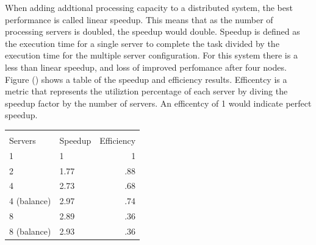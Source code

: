 \documentclass{article}
\begin{document}
\begin{multicols}{2}
\noindent{}

When adding addtional processing capacity to a distributed system, the best performance is called linear speedup.  This means that as the number of processing servers is doubled, the speedup would double. Speedup is defined as the execution time for a single server to complete the task divided by the execution time for the multiple server configuration.  For this system there is a less than linear speedup, and loss of improved perfomance after four nodes.  Figure () shows a table of the speedup and efficiency results.  Efficentcy is a metric that represents the utiliztion percentage of each server by diving the speedup factor by the number of servers.  An efficentcy of 1 would indicate perfect speedup.

\begin{tabular}{llr}
\multicolumn{3}{c}{} \\
\cline{1-3}
Servers    & Speedup & Efficiency  \\
\hline
1     &  1  & 1   \\
2     &   1.77  & .88  \\
4     &   2.73  & .68 \\
4 (balance) & 2.97 & .74     \\
8 &  2.89   & .36  \\
8 (balance) & 2.93 & .36      \\
\hline
\end{tabular}


\end{multicols}
\end{document}
